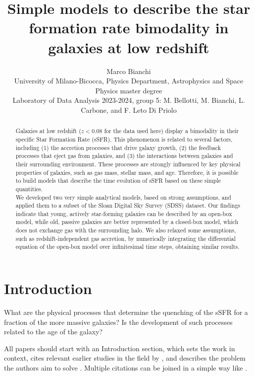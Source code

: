 \documentclass[fleqn,usenatbib]{mnras}
\title[Short title, max. 45 characters]{Simple models to describe the star formation rate bimodality in galaxies at low redshift}
\author[M. Bianchi]{
Marco Bianchi
\\
University of Milano-Bicocca, Physics Department, Astrophysics and Space Physics master degree\\
Laboratory of Data Analysis 2023-2024, group 5: M. Bellotti, M. Bianchi, L. Carbone, and F. Leto Di Priolo\\
}
\begin{document}
\label{firstpage}
\pagerange{\pageref{firstpage}--\pageref{lastpage}}
\maketitle

\begin{abstract}
Galaxies at low redshift ($z<0.08$ for the data used here) display a bimodality in their specific Star Formation Rate (sSFR). This phenomenon is related to several factors, including (1) the accretion processes that drive galaxy growth, (2) the feedback processes that eject gas from galaxies, and (3) the interactions between galaxies and their surrounding environment. These processes are strongly influenced by key physical properties of galaxies, such as gas mass, stellar mass, and age. Therefore, it is possible to build models that describe the time evolution of sSFR based on these simple quantities. \\
We developed two very simple analytical models, based on strong assumptions, and applied them to a subset of the Sloan Digital Sky Survey (SDSS) dataset. Our findings indicate that young, actively star-forming galaxies can be described by an open-box model, while old, passive galaxies are better represented by a closed-box model, which does not exchange gas with the surrounding halo. We also relaxed some assumptions, such as redshift-independent gas accretion, by numerically integrating the differential equation of the open-box model over infinitesimal time steps, obtaining similar results.
\bigskip
\end{abstract} 





\section{Introduction}\label{sec:introduction}
What are the physical processes that determine the quenching of the sSFR for a fraction of the more massive galaxies? 
Is the development of such processes related to the age of the galaxy?

All papers should start with an Introduction section, which sets the work
in context, cites relevant earlier studies in the field by \citet{Kennicutt_1998},
and describes the problem the authors aim to solve \citep[e.g.][]{Dave_2011}.
Multiple citations can be joined in a simple way like \citet{mMoster_2012,McBride_2009}.
\end{document}
